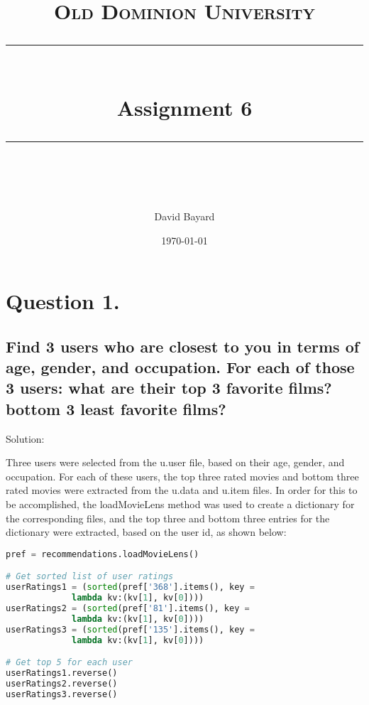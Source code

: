 \documentclass[11pt]{scrartcl} %
\title{
	\normalfont\normalsize
	\textsc{Old Dominion University}\\ %
	\vspace{25pt} %
	\rule{\linewidth}{0.5pt}\\ %
	\vspace{20pt} %
	{\huge Assignment 6}\\ %
	\vspace{12pt} %
	\rule{\linewidth}{2pt}\\ %
	\vspace{12pt} %
}
\author{\LARGE David Bayard} %
\date{\normalsize\today} %
\begin{document}

\lstset{style=pythonStyle}


\maketitle %

\pagebreak
\section*{Question 1.}




\subsection*{Find 3 users who are closest to you in terms of age, 
gender, and occupation.  For each of those 3 users: \newline
what are their top 3 favorite films? \newline
bottom 3 least favorite films?}
\bigskip\bigskip


\LARGE Solution:
\newline \newline\small

\tabto{2.0cm} Three users were selected from the u.user file, based on their age, gender, and occupation. For each of these users, the top three rated movies and bottom three rated movies were extracted from the u.data and u.item files. In order for this to be accomplished, the loadMovieLens method was used to create a dictionary for the corresponding files, and the top three and bottom three entries for the dictionary were extracted, based on the user id, as shown below:

\begin{lstlisting}[language = Python, caption=Loading user data]
pref = recommendations.loadMovieLens()

# Get sorted list of user ratings
userRatings1 = (sorted(pref['368'].items(), key = 
             lambda kv:(kv[1], kv[0]))) 
userRatings2 = (sorted(pref['81'].items(), key = 
             lambda kv:(kv[1], kv[0]))) 
userRatings3 = (sorted(pref['135'].items(), key = 
             lambda kv:(kv[1], kv[0]))) 

# Get top 5 for each user
userRatings1.reverse()
userRatings2.reverse()
userRatings3.reverse()
\end{lstlisting} \bigskip 
\end{document}
